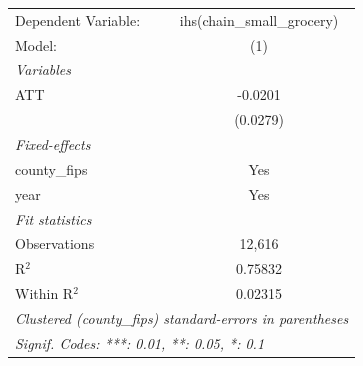 
\begingroup
\centering
\begin{tabular}{lc}
   \tabularnewline \midrule \midrule
   Dependent Variable: & ihs(chain\_small\_grocery)\\    
   Model:              & (1)\\  
   \midrule
   \emph{Variables}\\
   ATT                 & -0.0201\\   
                       & (0.0279)\\   
   \midrule
   \emph{Fixed-effects}\\
   county\_fips        & Yes\\  
   year                & Yes\\  
   \midrule
   \emph{Fit statistics}\\
   Observations        & 12,616\\  
   R$^2$               & 0.75832\\  
   Within R$^2$        & 0.02315\\  
   \midrule \midrule
   \multicolumn{2}{l}{\emph{Clustered (county\_fips) standard-errors in parentheses}}\\
   \multicolumn{2}{l}{\emph{Signif. Codes: ***: 0.01, **: 0.05, *: 0.1}}\\
\end{tabular}
\par\endgroup


